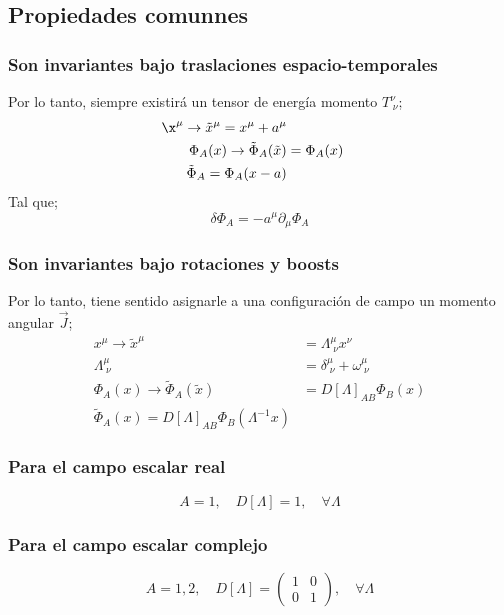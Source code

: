\documentclass[../main.tex]{subfiles}
\begin{document}
   \subsection{Propiedades comunnes}
\subsubsection{Son invariantes bajo traslaciones espacio-temporales}
Por lo tanto, siempre existirá un tensor de energía momento $T^\nu_{\;\nu}$;
\begin{align*}
  \x^\mu\rightarrow \tilde{x}^\mu = x^\mu + a^\mu \\
  \Phi_A(x) \rightarrow \tilde{\Phi}_A(\tilde{x}) & = \Phi_A(x)\\
  \tilde{\Phi}_A = \Phi_A(x-a)
\end{align*}
Tal que;
\begin{equation}
  \delta \Phi_A = -a^\mu \partial_\mu \Phi_A
 \end{equation}
 \subsubsection{Son invariantes bajo rotaciones y boosts}
 Por lo tanto, tiene sentido asignarle a una configuración de campo un momento angular $\vec{J}$;
 \begin{align*}
   x^\mu \rightarrow \tilde{x}^\mu & = \Lambda^\mu_{\;\nu} x^\nu \\
   \Lambda^\mu_{\;\nu} & = \delta^\mu_{\;\nu} + \omega^\mu_{\;\nu} \\
   \Phi_{A}(x) \rightarrow \tilde{\Phi}_A(\tilde{x}) & = D[\Lambda]_{AB} \Phi_B(x) \\
   \tilde{\Phi}_A (x) = D[\Lambda]_{AB}\Phi_B(\Lambda^{-1}x)
 \end{align*}
 \subsubsection{Para el campo escalar real}
 \begin{equation}
   A=1,\quad D[\Lambda]=1,\quad \forall \Lambda
  \end{equation}
  \subsubsection{Para el campo escalar complejo}
  \begin{equation}
    A=1,2,\quad D[\Lambda] = \begin{pmatrix}
      1 & 0 \\ 0 & 1 
    \end{pmatrix},\quad \forall \Lambda
   \end{equation}
\end{document}
